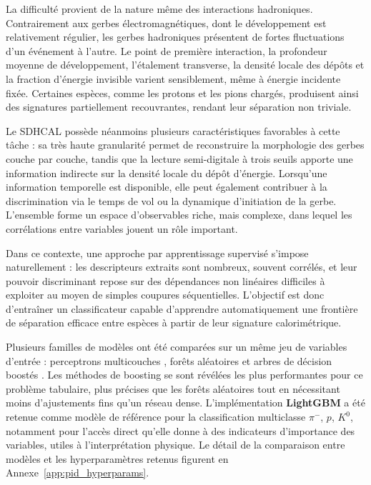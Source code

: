 La difficulté provient de la nature même des interactions hadroniques. Contrairement aux gerbes électromagnétiques, dont le développement est relativement régulier, les gerbes hadroniques présentent de fortes fluctuations d'un événement à l'autre. Le point de première interaction, la profondeur moyenne de développement, l'étalement transverse, la densité locale des dépôts et la fraction d'énergie invisible varient sensiblement, même à énergie incidente fixée. Certaines espèces, comme les protons et les pions chargés, produisent ainsi des signatures partiellement recouvrantes, rendant leur séparation non triviale.

Le SDHCAL possède néanmoins plusieurs caractéristiques favorables à cette tâche : sa très haute granularité permet de reconstruire la morphologie des gerbes couche par couche, tandis que la lecture semi-digitale à trois seuils apporte une information indirecte sur la densité locale du dépôt d'énergie. Lorsqu'une information temporelle est disponible, elle peut également contribuer à la discrimination via le temps de vol ou la dynamique d'initiation de la gerbe. L'ensemble forme un espace d'observables riche, mais complexe, dans lequel les corrélations entre variables jouent un rôle important.

Dans ce contexte, une approche par apprentissage supervisé s'impose naturellement : les descripteurs extraits sont nombreux, souvent corrélés, et leur pouvoir discriminant repose sur des dépendances non linéaires difficiles à exploiter au moyen de simples coupures séquentielles. L'objectif est donc d'entraîner un classificateur capable d'apprendre automatiquement une frontière de séparation efficace entre espèces à partir de leur signature calorimétrique.

Plusieurs familles de modèles ont été comparées sur un même jeu de variables d'entrée : perceptrons multicouches \cite{rumelhart1986, goodfellow2016}, forêts aléatoires et arbres de décision boostés \cite{hastie2009}. Les méthodes de boosting se sont révélées les plus performantes pour ce problème tabulaire, plus précises que les forêts aléatoires tout en nécessitant moins d'ajustements fins qu'un réseau dense. L'implémentation \textbf{LightGBM} \cite{ke2017} a été retenue comme modèle de référence pour la classification multiclasse $\pi^-$, $p$, $K^0$, notamment pour l'accès direct qu'elle donne à des indicateurs d'importance des variables, utiles à l'interprétation physique. Le détail de la comparaison entre modèles et les hyperparamètres retenus figurent en Annexe~\ref{app:pid_hyperparams}.

